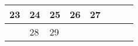 {\begin{tabularx}{\linewidth}{|l!{\vrule width \myLenLineThicknessThick}*{7}{@{}X@{}|}}
      
      
        \begin{minipage}[t]{6mm}\centering{}23\end{minipage}
      
       & 
    
      
      
        \begin{minipage}[t]{6mm}\centering{}24\end{minipage}
      
       & 
    
      
      
        \begin{minipage}[t]{6mm}\centering{}25\end{minipage}
      
       & 
    
      
      
        \begin{minipage}[t]{6mm}\centering{}26\end{minipage}
      
       & 
    
      
      
        \begin{minipage}[t]{6mm}\centering{}27\end{minipage}
      
      
        \\  \hline 
      
    
  
  
  
  \hyperlink{week-2027-26}{} &
    
      
      
        \begin{minipage}[t]{6mm}\centering{}28\end{minipage}
      
       & 
    
      
      
        \begin{minipage}[t]{6mm}\centering{}29\end{minipage}
      
       & 
    
      
      

\end{tabularx}}

